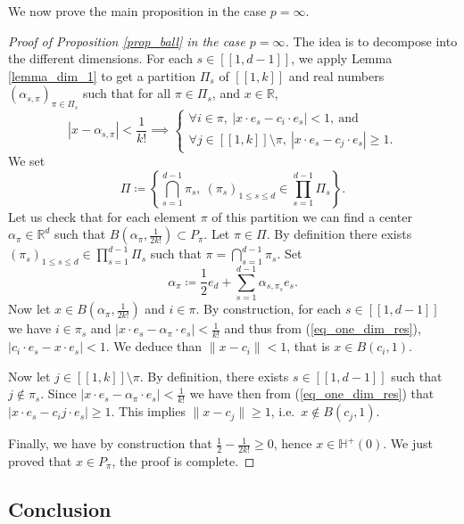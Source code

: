 \documentclass[a4paper, 11pt]{article}
\theoremstyle{plain}
\theoremstyle{definition}
\newcommand{\R}{\mathbb{R}}
\newcommand{\range}[2]{[\![#1,#2]\!]}
\numberwithin{equation}{section}
\begin{document}
We now prove the main proposition in the case $p=\infty$.


\begin{proof}[Proof of Proposition \ref{prop_ball} in the case $p=\infty$]
    The idea is to decompose into the different dimensions. For each $s\in\range{1}{d-1}$, we apply Lemma \ref{lemma_dim_1} to get a partition $\Pi_s$ of $\range{1}{k}$ and real numbers $(\alpha_{s, \pi})_{\pi\in\Pi_s}$ such that for all $\pi\in\Pi_s$, and $x\in\R$,
    \begin{equation}
        \label{eq_one_dim_res}
        |x-\alpha_{s, \pi}|<\frac{1}{k!}\implies
            \begin{cases}
                \forall i\in\pi,~|x\cdot e_s-c_i\cdot e_s|<1,~\text{and}\\
                \forall j\in\range{1}{k}\setminus\pi,~|x\cdot e_s-c_j\cdot e_s|\geq1.
            \end{cases}
    \end{equation}
    We set
        \[\Pi\coloneqq\left\lbrace\bigcap_{s=1}^{d-1}\pi_s,~(\pi_s)_{1\leq s\leq d}\in\prod_{s=1}^{d-1} \Pi_s\right\rbrace.\]
    Let us check that for each element $\pi$ of this partition we can find a center $\alpha_\pi\in\R^d$ such that $B\left(\alpha_\pi,\frac{1}{2k!}\right)\subset P_\pi$. Let $\pi\in\Pi$. By definition there exists $(\pi_s)_{1\leq s\leq d}\in\prod_{s=1}^{d-1} \Pi_s$ such that $\pi=\bigcap_{s=1}^{d-1}\pi_s$. Set
        \[\alpha_\pi\coloneqq\frac{1}{2}e_d+\sum_{s=1}^{d-1} \alpha_{s,\pi_s}e_s.\]
    Now let $x\in B\left(\alpha_\pi, \frac{1}{2k!}\right)$ and $i\in\pi$. By construction, for each $s\in\range{1}{d-1}$ we have $i\in\pi_s$ and $|x\cdot e_s-\alpha_\pi\cdot e_s|<\frac{1}{k!}$ and thus from (\ref{eq_one_dim_res}), $|c_i\cdot e_s-x\cdot e_s|<1$. We deduce than $\|x-c_i\|<1$, that is $x\in B(c_i,1)$.
    
    Now let $j\in\range{1}{k}\setminus\pi$. By definition, there exists $s\in\range{1}{d-1}$ such that $j\notin\pi_s$. Since $|x\cdot e_s-\alpha_\pi\cdot e_s|<\frac{1}{k!}$ we have then from (\ref{eq_one_dim_res}) that $|x\cdot e_s-c_ij\cdot e_s|\geq1$. This implies $\|x-c_j\|\geq 1$, i.e.\ $x\notin B(c_j,1)$. 
    
    Finally, we have by construction that $\frac{1}{2}-\frac{1}{2k!}\geq0$, hence $x\in\mathbb H^+(0)$. We just proved that $x\in P_\pi$, the proof is complete.
\end{proof}


\subsection{Conclusion}
\end{document}
